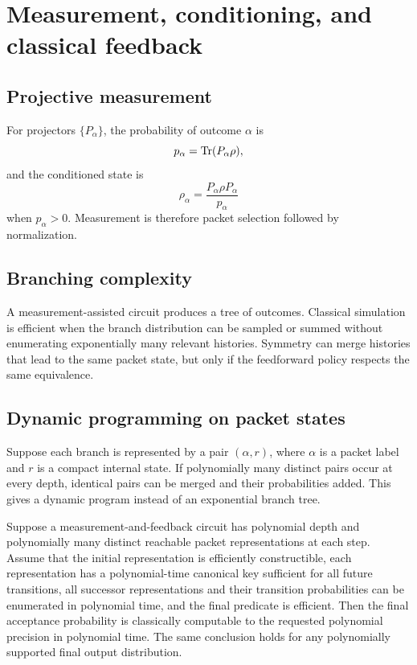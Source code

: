 \chapter{Measurement, conditioning, and classical feedback}
\label{ch:measurement}

\section{Projective measurement}
For projectors $\{P_\alpha\}$, the probability of outcome $\alpha$ is
\[
p_\alpha
=
\operatorname{Tr}(P_\alpha\rho),
\]
and the conditioned state is
\[
\rho_\alpha
=
\frac{P_\alpha\rho P_\alpha}{p_\alpha}
\]
when $p_\alpha>0$. Measurement is therefore packet selection followed by normalization.

\section{Branching complexity}
A measurement-assisted circuit produces a tree of outcomes. Classical simulation is efficient when the branch distribution can be sampled or summed without enumerating exponentially many relevant histories. Symmetry can merge histories that lead to the same packet state, but only if the feedforward policy respects the same equivalence.

\section{Dynamic programming on packet states}
Suppose each branch is represented by a pair $(\alpha,r)$, where $\alpha$ is a packet label and $r$ is a compact internal state. If polynomially many distinct pairs occur at every depth, identical pairs can be merged and their probabilities added. This gives a dynamic program instead of an exponential branch tree.

\begin{proposition}
Suppose a measurement-and-feedback circuit has polynomial depth and polynomially many distinct reachable packet representations at each step. Assume that the initial representation is efficiently constructible, each representation has a polynomial-time canonical key sufficient for all future transitions, all successor representations and their transition probabilities can be enumerated in polynomial time, and the final predicate is efficient. Then the final acceptance probability is classically computable to the requested polynomial precision in polynomial time. The same conclusion holds for any polynomially supported final output distribution.
\end{proposition}

